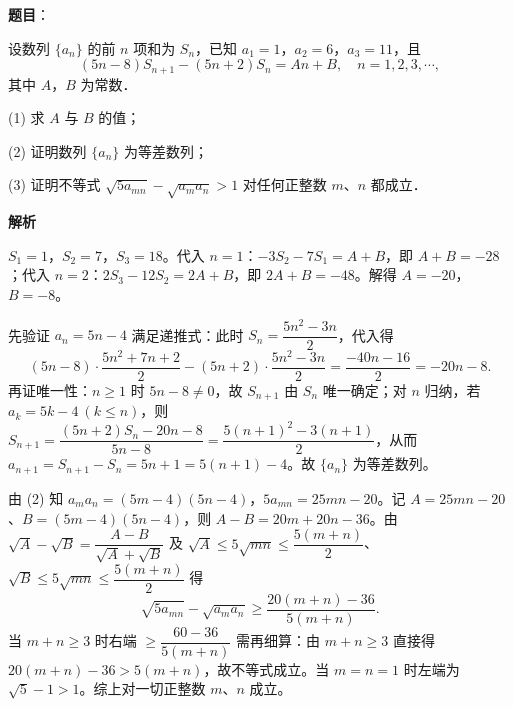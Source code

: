 \begin{answer}

\textbf{题目}：

设数列 $\{a_n\}$ 的前 $n$ 项和为 $S_n$，已知 $a_1 = 1$，$a_2 = 6$，$a_3 = 11$，且
\nopagebreak[4]
\[
(5n - 8)S_{n+1} - (5n + 2)S_n = An + B,\quad n = 1, 2, 3, \cdots,
\]
其中 $A$，$B$ 为常数．

(1) 求 $A$ 与 $B$ 的值；

(2) 证明数列 $\{a_n\}$ 为等差数列；

(3) 证明不等式 $\sqrt{5a_{mn}} - \sqrt{a_m a_n} > 1$ 对任何正整数 $m$、$n$ 都成立．

\textbf{解析}


$S_1 = 1$，$S_2 = 7$，$S_3 = 18$。代入 $n = 1$：$-3S_2 - 7S_1 = A + B$，即 $A + B = -28$；代入 $n = 2$：$2S_3 - 12S_2 = 2A + B$，即 $2A + B = -48$。解得 $A = -20$，$B = -8$。


先验证 $a_n = 5n - 4$ 满足递推式：此时 $S_n = \dfrac{5n^2 - 3n}{2}$，代入得
\nopagebreak[4]
\[
(5n-8)\cdot\frac{5n^2+7n+2}{2} - (5n+2)\cdot\frac{5n^2-3n}{2} = \frac{-40n - 16}{2} = -20n - 8.
\]
再证唯一性：$n \geqslant 1$ 时 $5n - 8 \neq 0$，故 $S_{n+1}$ 由 $S_n$ 唯一确定；对 $n$ 归纳，若 $a_k = 5k - 4\ (k \leqslant n)$，则 $S_{n+1} = \dfrac{(5n+2)S_n - 20n - 8}{5n-8} = \dfrac{5(n+1)^2 - 3(n+1)}{2}$，从而 $a_{n+1} = S_{n+1} - S_n = 5n + 1 = 5(n+1) - 4$。故 $\{a_n\}$ 为等差数列。


由 (2) 知 $a_m a_n = (5m-4)(5n-4)$，$5a_{mn} = 25mn - 20$。记 $A = 25mn - 20$、$B = (5m-4)(5n-4)$，则 $A - B = 20m + 20n - 36$。由 $\sqrt{A} - \sqrt{B} = \dfrac{A - B}{\sqrt{A} + \sqrt{B}}$ 及 $\sqrt{A} \leqslant 5\sqrt{mn} \leqslant \dfrac{5(m+n)}{2}$、$\sqrt{B} \leqslant 5\sqrt{mn} \leqslant \dfrac{5(m+n)}{2}$ 得
\nopagebreak[4]
\[
\sqrt{5a_{mn}} - \sqrt{a_m a_n} \geqslant \frac{20(m+n) - 36}{5(m+n)}.
\]
当 $m + n \geqslant 3$ 时右端 $\geqslant \dfrac{60 - 36}{5(m+n)}$ 需再细算：由 $m + n \geqslant 3$ 直接得 $20(m+n) - 36 > 5(m+n)$，故不等式成立。当 $m = n = 1$ 时左端为 $\sqrt{5} - 1 > 1$。综上对一切正整数 $m$、$n$ 成立。




\end{answer}